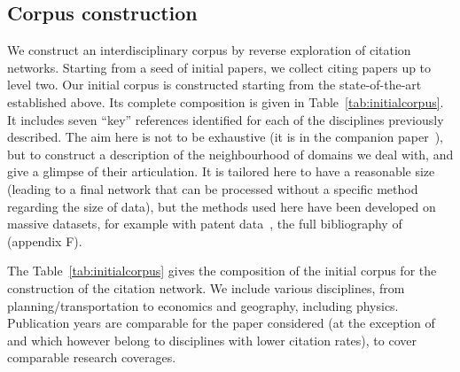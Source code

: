\documentclass[10pt]{article}
\begin{document}
\subsection{Corpus construction}


We construct an interdisciplinary corpus by reverse exploration of citation networks. Starting from a seed of initial papers, we collect citing papers up to level two. Our initial corpus is constructed starting from the state-of-the-art established above. Its complete composition is given in Table~\ref{tab:initialcorpus}. It includes seven ``key'' references identified for each of the disciplines previously described. The aim here is not to be exhaustive (it is in the companion paper~\cite{raimbault2020systematic}), but to construct a description of the neighbourhood of domains we deal with, and give a glimpse of their articulation. It is tailored here to have a reasonable size (leading to a final network that can be processed without a specific method regarding the size of data), but the methods used here have been developed on massive datasets, for example with patent data~\cite{bergeaud2017classifying}, the full bibliography of \cite{raimbault2018caracterisation} (appendix F).

The Table~\ref{tab:initialcorpus} gives the composition of the initial corpus for the construction of the citation network. We include various disciplines, from planning/transportation to economics and geography, including physics. Publication years are comparable for the paper considered (at the exception of \cite{offner1993effets} and \cite{offner1996reseaux} which however belong to disciplines with lower citation rates), to cover comparable research coverages.

\end{document}
